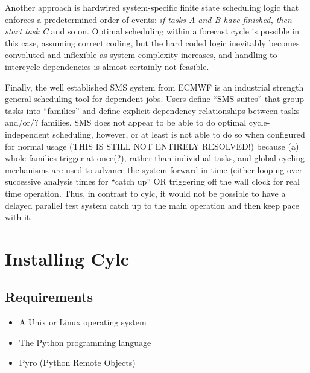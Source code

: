 \documentclass[11pt,a4paper]{article}
\begin{document}
Another approach is hardwired system-specific finite state scheduling
logic that enforces a predetermined order of events: {\em if tasks A and
B have finished, then start task C} and so on. Optimal scheduling within
a forecast cycle is possible in this case, assuming correct coding, but
the hard coded logic inevitably becomes convoluted and inflexible as
system complexity increases, and handling to intercycle dependencies is
almost certainly not feasible.  

Finally, the well established SMS system from ECMWF is an industrial
strength general scheduling tool for dependent jobs. Users define ``SMS
suites'' that group tasks into ``families'' and define explicit
dependency relationships between tasks and/or/? families. SMS does not
appear to be able to do optimal cycle-independent scheduling, however,
or at least is not able to do so when configured for normal usage (THIS
IS STILL NOT ENTIRELY RESOLVED!) because (a) whole families trigger 
at once(?), rather than individual tasks, and global cycling mechanisms
are used to advance the system forward in time (either looping
over successive analysis times for ``catch up'' OR triggering off the
wall clock for real time operation. Thus, in contrast to cylc, it would
not be possible to have a delayed parallel test system catch up to the
main operation and then keep pace with it.




\pagebreak
\section{Installing Cylc}
\label{sec:usage}

\subsection{Requirements}

\begin{itemize}
    \item A Unix or Linux operating system
    \item The Python programming language
    \item Pyro (Python Remote Objects)
\end{itemize}
\end{document}
